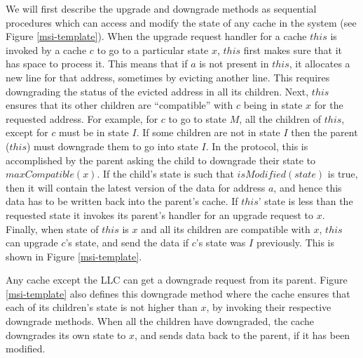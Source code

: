We will first describe the upgrade and downgrade methods as sequential procedures which can access and modify the state of any cache in the system (see
Figure \ref{msi-template}).  
When the upgrade request handler \uReq{} for a cache $this$ is invoked by a
cache $c$ to go to a particular state $x$, $this$ first makes sure that it has space to process it. This means that if $a$ is not present in $this$, it allocates a new line for that address, sometimes by evicting another line. This requires downgrading the status of the evicted address in all its children. Next, $this$ ensures that its
other children are ``compatible'' with $c$ being in state $x$ for the requested
address. For example, for $c$ to go to state $M$, all the children of $this$, except for $c$ must be in state $I$. If some children are not in state $I$ then the parent (\ie $this$) must downgrade them to go into state $I$. In the protocol, this is accomplished by the parent asking the child to downgrade their state to $maxCompatible(x)$. If the child's state is such that $isModified(state)$ is true, then it will contain the latest version of the data for address $a$, and hence this data has to be written back into the parent's cache.
If $this$' state is less than the requested state it invokes
its parent's handler for an upgrade request to $x$. Finally, when state of $this$ is $x$ and all its children are compatible with $x$, $this$ can upgrade
$c$'s state, and send the data if $c$'s state was $I$ previously. This is shown
in Figure \ref{msi-template}.

Any cache except the LLC can get a downgrade request from its parent. Figure \ref{msi-template} also defines this downgrade method \dReq{} where the cache
ensures that each of its children's state is not higher than $x$, by invoking
their respective downgrade methods. When all the children have downgraded, the
cache downgrades its own state to $x$, and sends data back to the parent, if it
has been modified.




